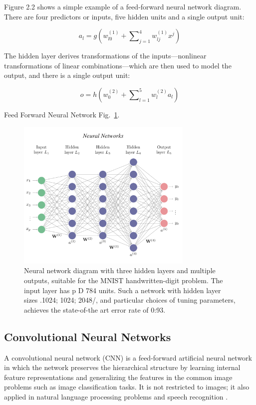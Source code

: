 Figure 2.2 shows a simple example of a feed-forward neural network diagram. There are four predictors or inputs, five hidden units and a single output unit:

\begin{equation}
a_{l} =g\left( w^{( 1)}_{l0} +\sum\nolimits ^{4}_{j=1} w^{( 1)}_{lj} x^{j}\right)
\label{four input units and five hidden units}
\end{equation}

The hidden layer derives transformations of the
inputs—nonlinear transformations of linear combinations—which are then used to model the output, and there is a single output unit:

\begin{equation}
 o=h\left( w^{( 2)}_{0} +\sum\nolimits ^{5}_{l=1} w^{( 2)}_{l} a_{l}\right)
 \label{single output units}
\end{equation}

Feed Forward Neural Network Fig.~\ref{fig:multi-layer}.
\begin{figure}[htbp]
\centering
\includegraphics[width=0.75\textwidth]{images/NN.png}
\caption{Neural network diagram with three hidden layers and multiple outputs, suitable for the MNIST handwritten-digit problem. The input layer has p D 784 units. Such a network with hidden layer sizes .1024; 1024; 2048/, and particular choices of tuning parameters, achieves the state-of-the art error rate of 0:93.}
\label{fig:multi-layer}
\end{figure}

\clearpage

\subsection{Convolutional Neural Networks}
A convolutional neural network (CNN) is a feed-forward artificial neural network in which the network preserves the hierarchical structure by learning internal feature representations and generalizing the features in the common image problems such as image classification tasks. It is not restricted to images; it also applied in natural language processing problems and speech recognition \cite{Manaswi2018}.

